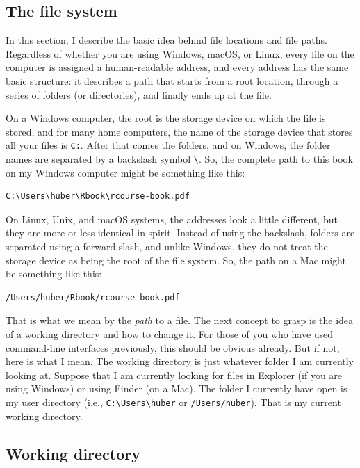 \documentclass[
  12pt,
  oneside]{book}
\theoremstyle{definition}
\theoremstyle{definition}
\theoremstyle{definition}
\theoremstyle{definition}
\theoremstyle{remark}
\begin{document}
\hypertarget{sec:filesystem}{%
\subsection{The file system}\label{sec:filesystem}}

In this section, I describe the basic idea behind file locations and file paths. Regardless of whether you are using Windows, macOS, or Linux, every file on the computer is assigned a human-readable address, and every address has the same basic structure: it describes a path that starts from a root location, through a series of folders (or directories), and finally ends up at the file.

On a Windows computer, the root is the storage device on which the file is stored, and for many home computers, the name of the storage device that stores all your files is \texttt{C:}. After that comes the folders, and on Windows, the folder names are separated by a backslash symbol \texttt{\textbackslash{}}. So, the complete path to this book on my Windows computer might be something like this:

\begin{verbatim}
C:\Users\huber\Rbook\rcourse-book.pdf
\end{verbatim}

On Linux, Unix, and macOS systems, the addresses look a little different, but they are more or less identical in spirit. Instead of using the backslash, folders are separated using a forward slash, and unlike Windows, they do not treat the storage device as being the root of the file system. So, the path on a Mac might be something like this:

\begin{verbatim}
/Users/huber/Rbook/rcourse-book.pdf
\end{verbatim}

That is what we mean by the \emph{path} to a file. The next concept to grasp is the idea of a working directory and how to change it. For those of you who have used command-line interfaces previously, this should be obvious already. But if not, here is what I mean. The working directory is just whatever folder I am currently looking at. Suppose that I am currently looking for files in Explorer (if you are using Windows) or using Finder (on a Mac). The folder I currently have open is my user directory (i.e., \texttt{C:\textbackslash{}Users\textbackslash{}huber} or \texttt{/Users/huber}). That is my current working directory.

\hypertarget{working-directory}{%
\subsection{Working directory}\label{working-directory}}
\end{document}
